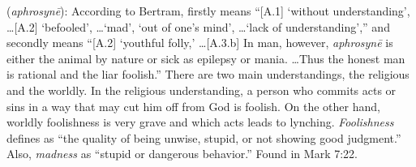 \item[Foolishness,]

(\textit{aphrosynē}):
According to Bertram, firstly  means ``[A.1] `without understanding', \ldots [A.2] `befooled', \ldots `mad', `out of one's mind',  \ldots `lack of understanding',''
and secondly  means ``[A.2] `youthful folly,' \ldots [A.3.b] In man, however, \emph{aphrosynē} is either the animal by nature or sick as epilepsy or mania. \ldots Thus the honest man is rational and the liar foolish.''
There are two main understandings, the religious and the worldly. In the religious understanding, a person who commits acts or sins in a way that may cut him off from God is foolish. On the other hand, worldly foolishness is very grave and which acts leads to lynching. \emph{Foolishness} defines as ``the quality of being unwise, stupid, or not showing good judgment.'' Also, \emph{madness} as ``stupid or dangerous behavior.''
Found in Mark 7:22.
